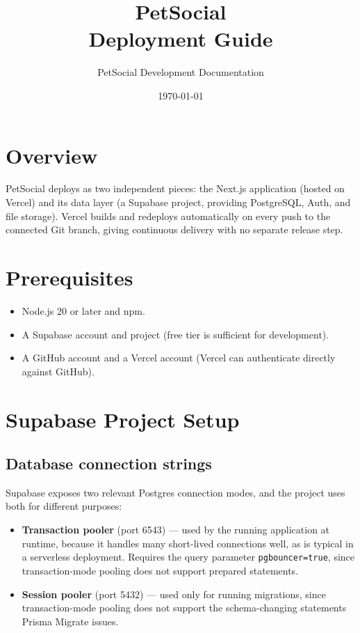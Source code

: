 \documentclass[11pt,a4paper]{article}
\title{PetSocial\\\large Deployment Guide}
\author{PetSocial Development Documentation}
\date{\today}
\begin{document}
\maketitle
\thispagestyle{fancy}
\tableofcontents

\section{Overview}
PetSocial deploys as two independent pieces: the Next.js application (hosted on
Vercel) and its data layer (a Supabase project, providing PostgreSQL, Auth, and file
storage). Vercel builds and redeploys automatically on every push to the connected Git
branch, giving continuous delivery with no separate release step.

\section{Prerequisites}
\begin{itemize}[leftmargin=*]
  \item Node.js 20 or later and npm.
  \item A Supabase account and project (free tier is sufficient for development).
  \item A GitHub account and a Vercel account (Vercel can authenticate directly against
        GitHub).
\end{itemize}

\section{Supabase Project Setup}

\subsection{Database connection strings}
Supabase exposes two relevant Postgres connection modes, and the project uses both for
different purposes:

\begin{itemize}[leftmargin=*]
  \item \textbf{Transaction pooler} (port 6543) --- used by the running application at
        runtime, because it handles many short-lived connections well, as is typical in
        a serverless deployment. Requires the query parameter
        \texttt{pgbouncer=true}, since transaction-mode pooling does not support
        prepared statements.
  \item \textbf{Session pooler} (port 5432) --- used only for running migrations, since
        transaction-mode pooling does not support the schema-changing statements
        Prisma Migrate issues.
\end{itemize}
\end{document}
